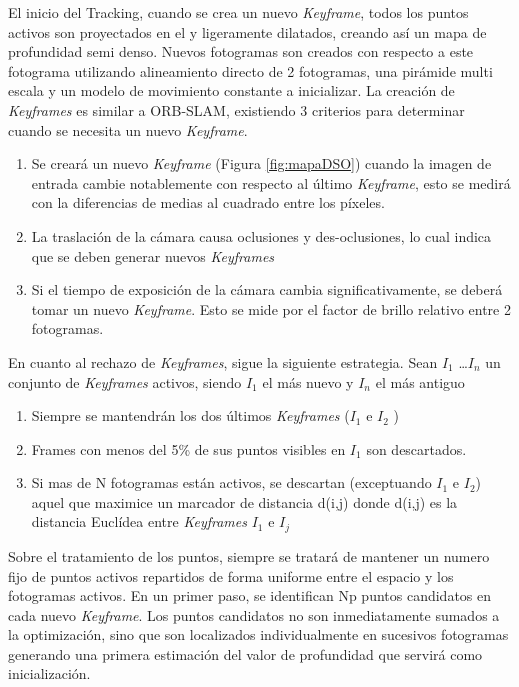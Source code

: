 El inicio del Tracking, cuando se crea un nuevo \textit{Keyframe}, todos los puntos activos son proyectados en el y ligeramente dilatados, creando así un mapa de profundidad semi denso. Nuevos fotogramas son creados con respecto a este fotograma utilizando alineamiento directo de 2 fotogramas, una pirámide multi escala y un modelo de movimiento constante a inicializar. 
La creación de \textit{Keyframes} es similar a ORB-SLAM, existiendo 3 criterios para determinar cuando se necesita un nuevo \textit{Keyframe}.
\begin {enumerate}
\item Se creará un nuevo \textit{Keyframe} (Figura \ref{fig:mapaDSO}) cuando la imagen de entrada cambie notablemente con respecto al último \textit{Keyframe}, esto se medirá con la diferencias de medias al cuadrado entre los píxeles.
\item La traslación de la cámara causa oclusiones y des-oclusiones, lo cual indica que se deben generar nuevos \textit{Keyframes}
\item Si el tiempo de exposición de la cámara cambia significativamente, se deberá tomar un nuevo \textit{Keyframe}. Esto se mide por el factor de brillo relativo entre 2 fotogramas. 
\end {enumerate}

En cuanto al rechazo de \textit{Keyframes}, sigue la siguiente estrategia. Sean $I_1$ \dots $I_n$ un conjunto de \textit{Keyframes} activos, siendo $I_1$ el más nuevo y $I_n$ el más antiguo
\begin {enumerate}
\item Siempre se mantendrán los dos últimos \textit{Keyframes} ($I_1$  e $I_2$ )
\item Frames con menos del 5\% de sus puntos visibles en $I_1$  son descartados.
\item Si mas de N fotogramas están activos, se descartan (exceptuando $I_1$  e $I_2$) aquel que maximice un marcador de distancia d(i,j) donde d(i,j) es la distancia Euclídea entre \textit{Keyframes} $I_1$  e $I_j$
\end {enumerate}

Sobre el tratamiento de los puntos, siempre se tratará de mantener un numero fijo de puntos activos repartidos de forma uniforme entre el espacio y los fotogramas activos. En un primer paso, se identifican Np puntos candidatos en cada nuevo \textit{Keyframe}. Los puntos candidatos no son inmediatamente sumados a la optimización, sino que son localizados individualmente en sucesivos fotogramas generando una primera estimación del valor de profundidad que servirá como inicialización. 

